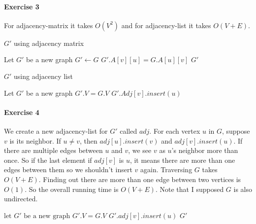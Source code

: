 \documentclass{book}
\begin{document}
	\paragraph{Exercise 3}
	For adjacency-matrix it takes $O(V^2)$ and for adjacency-list it takes $O(V + E)$.
	\begin{algorithm}[h!]
		\caption{$G'$ using adjacency matrix}
		\begin{algorithmic}[1]
				\State Let $G'$ be a new graph
				\State $G' \gets G$
						\State $G'.A[v][u] = G.A[u][v]$
					\EndFor
				\EndFor
				\State \Return $G'$
			\EndFunction
		\end{algorithmic}
	\end{algorithm}
	\begin{algorithm*}[h!]
		\caption{$G'$ using adjacency list}
		\begin{algorithmic}[1]
				\State Let $G'$ be a new graph
				\State $G'.V = G.V$
						\State $G'.Adj[v].insert(u)$
					\EndFor
				\EndFor
			\EndFunction
		\end{algorithmic}
	\end{algorithm*}
	\FloatBarrier
	\paragraph{Exercise 4}
	We create a new adjacency-list for $G'$ called $adj$. For each vertex $u$ in $G$, suppose $v$ is its neighbor. If $u \ne v$, then $adj[u].insert(v)$ and $adj[v].insert(u)$. If there are multiple edges between $u$ and $v$, we see $v$ as $u$'s neighbor more than once. So if the last element if $adj[v]$ is $u$, it means there are more than one edges between them so we shouldn't insert $v$ again. Traversing $G$ takes $O(V + E)$. Finding out there are more than one edge between two vertices is $O(1)$. So the overall running time is $O(V + E)$. Note that I supposed $G$ is also undirected.
	\begin{algorithm}[h!]
		\begin{algorithmic}[1]
			\State $\text{let }G' \text{ be a new graph}$
			\State $G'.V = G.V$
						\State $G'.adj[v].insert(u)$		
					\EndIf
				\EndFor
			\EndFor
			\State \Return $G'$
			\EndFunction
		\end{algorithmic}
	\end{algorithm}
\end{document}
